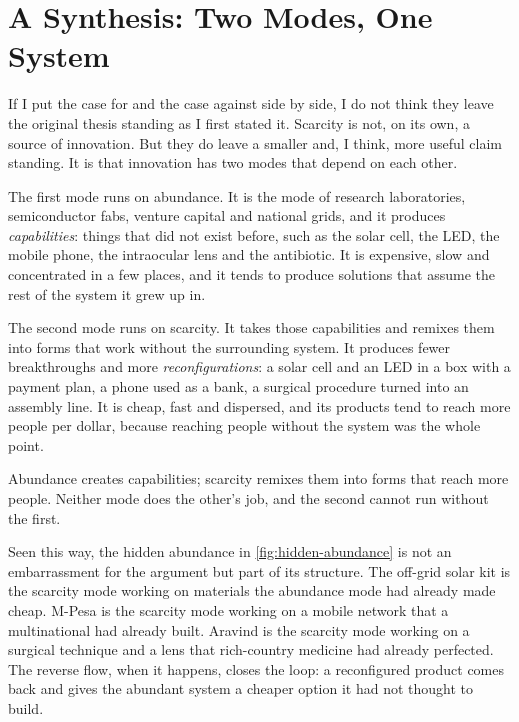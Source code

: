 \section{A Synthesis: Two Modes, One System}
\label{sec:synthesis}

If I put the case for and the case against side by side, I do not think they
leave the original thesis standing as I first stated it. Scarcity is not, on
its own, a source of innovation. But they do leave a smaller and, I think,
more useful claim standing. It is that innovation has two modes that depend on
each other.

The first mode runs on abundance. It is the mode of research laboratories,
semiconductor fabs, venture capital and national grids, and it produces
\emph{capabilities}: things that did not exist before, such as the solar cell,
the LED, the mobile phone, the intraocular lens and the antibiotic. It is
expensive, slow and concentrated in a few places, and it tends to produce
solutions that assume the rest of the system it grew up in.

The second mode runs on scarcity. It takes those capabilities and remixes them
into forms that work without the surrounding system. It produces fewer
breakthroughs and more \emph{reconfigurations}: a solar cell and an LED in a
box with a payment plan, a phone used as a bank, a surgical procedure turned
into an assembly line. It is cheap, fast and dispersed, and its products tend
to reach more people per dollar, because reaching people without the system
was the whole point.

\begin{keyidea}
Abundance creates capabilities; scarcity remixes them into forms that reach
more people. Neither mode does the other's job, and the second cannot run
without the first.
\end{keyidea}

Seen this way, the hidden abundance in \cref{fig:hidden-abundance} is not an
embarrassment for the argument but part of its structure. The off-grid solar
kit is the scarcity mode working on materials the abundance mode had already
made cheap. M-Pesa is the scarcity mode working on a mobile network that a
multinational had already built. Aravind is the scarcity mode working on a
surgical technique and a lens that rich-country medicine had already
perfected. The reverse flow, when it happens, closes the loop: a reconfigured
product comes back and gives the abundant system a cheaper option it had not
thought to build.


